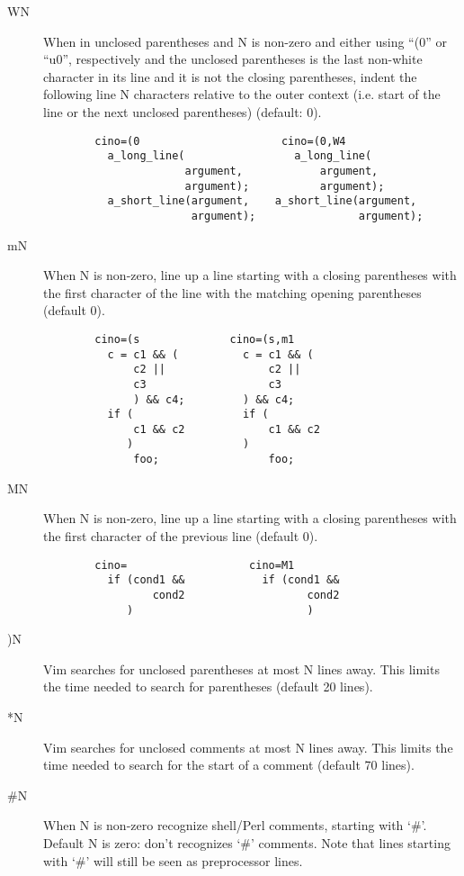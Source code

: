 \begin{description}
\begin{verbatim}
 \end{verbatim}
    \item[WN] When in unclosed parentheses and N is non-zero and either
          using ``(0'' or ``u0'', respectively and the unclosed parentheses is
          the last non-white character in its line and it is not the
          closing parentheses, indent the following line N characters
          relative to the outer context (i.e. start of the line or the
          next unclosed parentheses)  (default: 0).
\begin{verbatim}
        cino=(0                      cino=(0,W4
          a_long_line(                 a_long_line(
                      argument,            argument,
                      argument);           argument);
          a_short_line(argument,    a_short_line(argument,
                       argument);                argument);
 \end{verbatim}
 \clearpage
    \item[mN] When N is non-zero, line up a line starting with a closing
          parentheses with the first character of the line with the
          matching opening parentheses  (default 0).
\begin{verbatim}
        cino=(s              cino=(s,m1
          c = c1 && (          c = c1 && (
              c2 ||                c2 ||
              c3                   c3
              ) && c4;         ) && c4;
          if (                 if (
              c1 && c2             c1 && c2
             )                 )
              foo;                 foo;
 \end{verbatim}
    \item[MN] When N is non-zero, line up a line starting with a closing
          parentheses with the first character of the previous line
          (default 0).
\begin{verbatim}
        cino=                   cino=M1
          if (cond1 &&            if (cond1 &&
                 cond2                   cond2
             )                           )
 \end{verbatim}
 
    \item[)N] Vim searches for unclosed parentheses at most N lines away.
          This limits the time needed to search for parentheses  (default
          20 lines).

    \item[*N]    Vim searches for unclosed comments at most N lines away.  This
          limits the time needed to search for the start of a comment
          (default 70 lines).

    \item[\#N]    When N is non-zero recognize shell/Perl comments, starting with
          `\#'.  Default N is zero: don't recognizes `\#' comments.  Note
          that lines starting with `\#' will still be seen as preprocessor
          lines.

\end{description}
